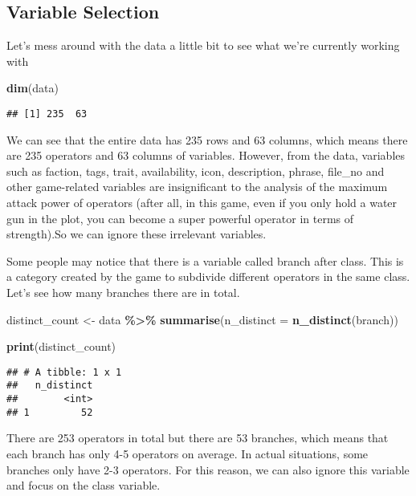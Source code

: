 \documentclass[
]{article}
\newenvironment{Shaded}{\begin{snugshade}}{\end{snugshade}}
\newcommand{\AttributeTok}[1]{\textcolor[rgb]{0.13,0.29,0.53}{#1}}
\newcommand{\FunctionTok}[1]{\textcolor[rgb]{0.13,0.29,0.53}{\textbf{#1}}}
\newcommand{\NormalTok}[1]{#1}
\newcommand{\OtherTok}[1]{\textcolor[rgb]{0.56,0.35,0.01}{#1}}
\newcommand{\SpecialCharTok}[1]{\textcolor[rgb]{0.81,0.36,0.00}{\textbf{#1}}}
\begin{document}
\subsection{Variable Selection}\label{variable-selection}

Let's mess around with the data a little bit to see what we're currently
working with

\begin{Shaded}
\begin{Highlighting}[]
\FunctionTok{dim}\NormalTok{(data)}
\end{Highlighting}
\end{Shaded}

\begin{verbatim}
## [1] 235  63
\end{verbatim}

We can see that the entire data has 235 rows and 63 columns, which means
there are 235 operators and 63 columns of variables. However, from the
data, variables such as faction, tags, trait, availability, icon,
description, phrase, file\_no and other game-related variables are
insignificant to the analysis of the maximum attack power of operators
(after all, in this game, even if you only hold a water gun in the plot,
you can become a super powerful operator in terms of strength).So we can
ignore these irrelevant variables.

Some people may notice that there is a variable called branch after
class. This is a category created by the game to subdivide different
operators in the same class. Let's see how many branches there are in
total.

\begin{Shaded}
\begin{Highlighting}[]
\NormalTok{distinct\_count }\OtherTok{\textless{}{-}}\NormalTok{ data }\SpecialCharTok{\%\textgreater{}\%}
  \FunctionTok{summarise}\NormalTok{(}\AttributeTok{n\_distinct =} \FunctionTok{n\_distinct}\NormalTok{(branch))}

\FunctionTok{print}\NormalTok{(distinct\_count)}
\end{Highlighting}
\end{Shaded}

\begin{verbatim}
## # A tibble: 1 x 1
##   n_distinct
##        <int>
## 1         52
\end{verbatim}

There are 253 operators in total but there are 53 branches, which means
that each branch has only 4-5 operators on average. In actual
situations, some branches only have 2-3 operators. For this reason, we
can also ignore this variable and focus on the class variable.
\end{document}

